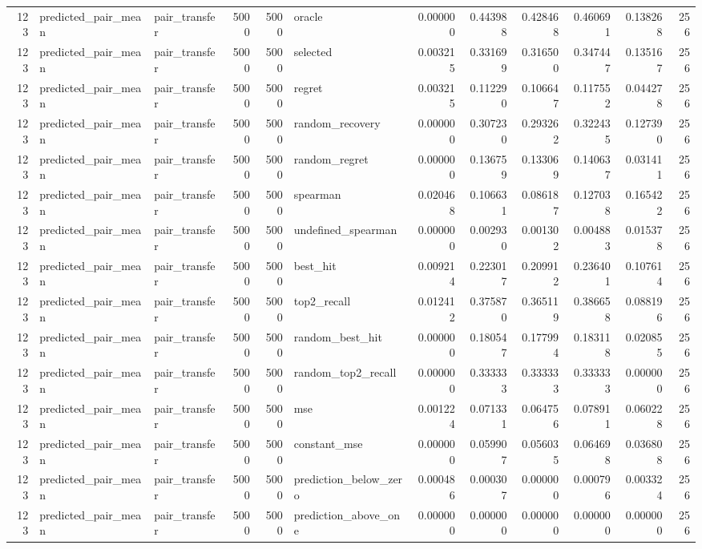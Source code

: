 \begin{tabular}{rllrrlrrrrrr}
123 & predicted_pair_mean & pair_transfer & 5000 & 5000 & oracle & 0.000000 & 0.443988 & 0.428468 & 0.460691 & 0.138268 & 256 \\
123 & predicted_pair_mean & pair_transfer & 5000 & 5000 & selected & 0.003215 & 0.331699 & 0.316500 & 0.347447 & 0.135167 & 256 \\
123 & predicted_pair_mean & pair_transfer & 5000 & 5000 & regret & 0.003215 & 0.112290 & 0.106647 & 0.117552 & 0.044278 & 256 \\
123 & predicted_pair_mean & pair_transfer & 5000 & 5000 & random_recovery & 0.000000 & 0.307230 & 0.293262 & 0.322435 & 0.127390 & 256 \\
123 & predicted_pair_mean & pair_transfer & 5000 & 5000 & random_regret & 0.000000 & 0.136759 & 0.133069 & 0.140637 & 0.031411 & 256 \\
123 & predicted_pair_mean & pair_transfer & 5000 & 5000 & spearman & 0.020468 & 0.106631 & 0.086187 & 0.127038 & 0.165422 & 256 \\
123 & predicted_pair_mean & pair_transfer & 5000 & 5000 & undefined_spearman & 0.000000 & 0.002930 & 0.001302 & 0.004883 & 0.015378 & 256 \\
123 & predicted_pair_mean & pair_transfer & 5000 & 5000 & best_hit & 0.009214 & 0.223017 & 0.209912 & 0.236401 & 0.107614 & 256 \\
123 & predicted_pair_mean & pair_transfer & 5000 & 5000 & top2_recall & 0.012412 & 0.375870 & 0.365119 & 0.386658 & 0.088196 & 256 \\
123 & predicted_pair_mean & pair_transfer & 5000 & 5000 & random_best_hit & 0.000000 & 0.180547 & 0.177994 & 0.183118 & 0.020855 & 256 \\
123 & predicted_pair_mean & pair_transfer & 5000 & 5000 & random_top2_recall & 0.000000 & 0.333333 & 0.333333 & 0.333333 & 0.000000 & 256 \\
123 & predicted_pair_mean & pair_transfer & 5000 & 5000 & mse & 0.001224 & 0.071331 & 0.064756 & 0.078911 & 0.060228 & 256 \\
123 & predicted_pair_mean & pair_transfer & 5000 & 5000 & constant_mse & 0.000000 & 0.059907 & 0.056035 & 0.064698 & 0.036808 & 256 \\
123 & predicted_pair_mean & pair_transfer & 5000 & 5000 & prediction_below_zero & 0.000486 & 0.000307 & 0.000000 & 0.000796 & 0.003324 & 256 \\
123 & predicted_pair_mean & pair_transfer & 5000 & 5000 & prediction_above_one & 0.000000 & 0.000000 & 0.000000 & 0.000000 & 0.000000 & 256 \\

\end{tabular}

